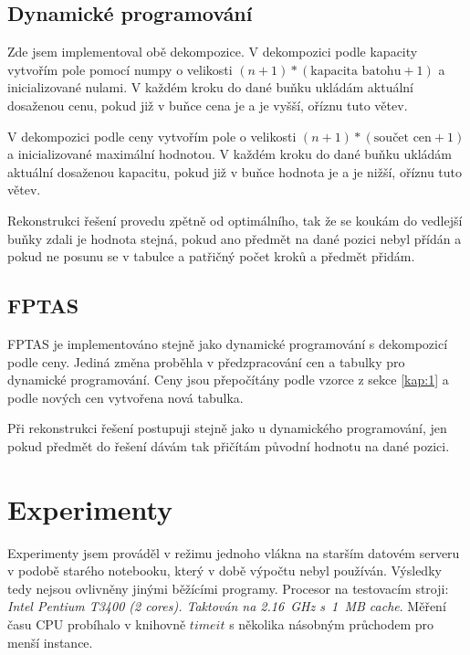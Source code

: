 \documentclass[11pt]{article}
\begin{document}
\subsection{Dynamické programování}
Zde jsem implementoval obě dekompozice. V dekompozici podle kapacity vytvořím pole pomocí numpy o velikosti $(n+1)*(\text{kapacita batohu} + 1)$ a inicializované nulami. V každém kroku do dané buňku ukládám aktuální dosaženou cenu, pokud již v buňce cena je a je vyšší, oříznu tuto větev.

V dekompozici podle ceny vytvořím pole o velikosti $(n+1)*(\text{součet cen} + 1)$ a inicializované maximální hodnotou. V každém kroku do dané buňku ukládám aktuální dosaženou kapacitu, pokud již v buňce hodnota je a je nižší, oříznu tuto větev.

Rekonstrukci řešení provedu zpětně od optimálního, tak že se koukám do vedlejší buňky zdali je hodnota stejná, pokud ano předmět na dané pozici nebyl přídán a pokud ne posunu se v tabulce a patřičný počet kroků a předmět přidám.

\subsection{FPTAS}
FPTAS je implementováno stejně jako dynamické programování s dekompozicí podle ceny. Jediná změna proběhla v předzpracování cen a tabulky pro dynamické programování. Ceny jsou přepočítány podle vzorce z sekce \ref{kap:1} a podle nových cen vytvořena nová tabulka. 

Při rekonstrukci řešení postupuji stejně jako u dynamického programování, jen pokud předmět do řešení dávám tak přičítám původní hodnotu na dané pozici.

\section{Experimenty}
 
Experimenty jsem prováděl v režimu jednoho vlákna na starším datovém serveru v podobě starého notebooku, který v době výpočtu nebyl používán. Výsledky tedy nejsou ovlivněny jinými běžícími programy. Procesor na testovacím stroji: \textit{Intel Pentium T3400 (2 cores). Taktován na 2.16~GHz s~1~MB cache}.
Měření času CPU probíhalo v knihovně $timeit$ s několika násobným průchodem pro menší instance.
\end{document}
